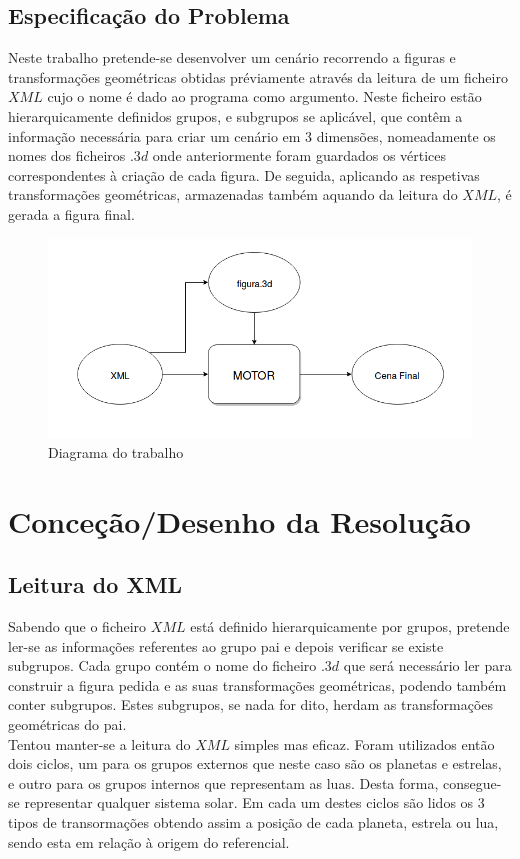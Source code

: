 \documentclass{report}
\begin{document}
\section{Especifica\c{c}\~{a}o do Problema} %
Neste trabalho pretende-se desenvolver um cen\'ario recorrendo a figuras e transforma\c{c}\~oes geom\'etricas obtidas pr\'eviamente atrav\'es da leitura de um ficheiro $XML$ cujo o nome \'e dado ao programa como argumento. Neste ficheiro est\~ao hierarquicamente definidos grupos, e subgrupos se aplic\'avel, que cont\^em a informa\c{c}\~ao necess\'aria para criar um cen\'ario em 3 dimens\~oes, nomeadamente os nomes dos ficheiros $.3d$ onde anteriormente foram guardados os v\'ertices correspondentes \`a cria\c{c}\~ao de cada figura. De seguida, aplicando as respetivas transforma\c{c}\~oes geom\'etricas, armazenadas tamb\'em aquando da leitura do $XML$, \'e gerada a figura final.
\begin{figure}[h]
\centering
\includegraphics[scale=0.3]{diagrama.png}
\caption{Diagrama do trabalho}
\end{figure}


\chapter{Conce\c{c}\~{a}o/Desenho da Resolu\c{c}\~{a}o} 
\section{Leitura do XML} %
Sabendo que o ficheiro $XML$ est\'a definido hierarquicamente por grupos, pretende ler-se as informa\c{c}\~oes referentes ao grupo pai e depois verificar se existe subgrupos. Cada grupo cont\'em o nome do ficheiro $.3d$ que ser\'a necess\'ario ler para construir a figura pedida e as suas transforma\c{c}\~oes geom\'etricas, podendo tamb\'em conter subgrupos. Estes subgrupos, se nada for dito, herdam as transforma\c{c}\~oes geom\'etricas do pai.
\\
Tentou manter-se a leitura do $XML$ simples mas eficaz. Foram utilizados ent\~ao dois ciclos, um para os grupos externos que neste caso s\~ao os planetas e estrelas, e outro para os grupos internos que representam as luas. Desta forma, consegue-se representar qualquer sistema solar.
Em cada um destes ciclos s\~ao lidos os 3 tipos de transorma\c{c}\~oes obtendo assim a posi\c{c}\~ao de cada planeta, estrela ou lua, sendo esta em relação \`a origem do referencial.
\\
\end{document}

